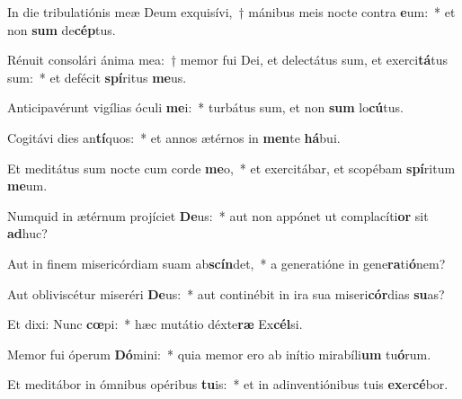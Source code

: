 \item In die tribulatiónis meæ Deum exquisívi,~† mánibus meis nocte contra \textbf{e}um:~* et non \textbf{sum} de\textbf{cép}tus.
\item Rénuit consolári ánima mea:~† memor fui Dei, et delectátus sum, et exerci\textbf{tá}tus sum:~* et defécit \textbf{spí}ritus \textbf{me}us.
\item Anticipavérunt vigílias óculi \textbf{me}i:~* turbátus sum, et non \textbf{sum} lo\textbf{cú}tus.
\item Cogitávi dies an\textbf{tí}quos:~* et annos ætérnos in \textbf{men}te \textbf{há}bui.
\item Et meditátus sum nocte cum corde \textbf{me}o,~* et exercitábar, et scopébam \textbf{spí}ritum \textbf{me}um.
\item Numquid in ætérnum projíciet \textbf{De}us:~* aut non appónet ut complacíti\textbf{or} sit \textbf{ad}huc?
\item Aut in finem misericórdiam suam ab\textbf{scín}det,~* a generatióne in gene\textbf{ra}ti\textbf{ó}nem?
\item Aut obliviscétur miseréri \textbf{De}us:~* aut continébit in ira sua miseri\textbf{cór}dias \textbf{su}as?
\item Et dixi: Nunc \textbf{cœ}pi:~* hæc mutátio déxte\textbf{ræ} Ex\textbf{cél}si.
\item Memor fui óperum \textbf{Dó}mini:~* quia memor ero ab inítio mirabíli\textbf{um} tu\textbf{ó}rum.
\item Et meditábor in ómnibus opéribus \textbf{tu}is:~* et in adinventiónibus tuis \textbf{ex}er\textbf{cé}bor.
